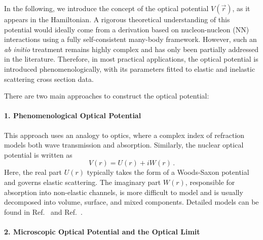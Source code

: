 In the following, we introduce the concept of the optical potential \( V(\vec{r}) \), as it appears in the Hamiltonian. 
A rigorous theoretical understanding of this potential would ideally come from a derivation based on nucleon-nucleon (NN) interactions using a fully self-consistent many-body framework. 
However, such an \textit{ab initio} treatment remains highly complex and has only been partially addressed in the literature. 
Therefore, in most practical applications, the optical potential is introduced phenomenologically, with its parameters fitted to elastic and inelastic scattering cross section data.

There are two main approaches to construct the optical potential:

\paragraph{1. Phenomenological Optical Potential}

This approach uses an analogy to optics, where a complex index of refraction models both wave transmission and absorption. 
Similarly, the nuclear optical potential is written as
\begin{equation}
V(r) = U(r) + iW(r) \, .
\end{equation}
Here, the real part \( U(r) \) typically takes the form of a Woods-Saxon potential and governs elastic scattering. 
The imaginary part \( W(r) \), responsible for absorption into non-elastic channels, is more difficult to model and is usually decomposed into volume, surface, and mixed components. 
Detailed models can be found in Ref.~\cite{obertelli2021modern} and Ref.~\cite{mayer2013kernphysik}.

\paragraph{2. Microscopic Optical Potential and the Optical Limit}

